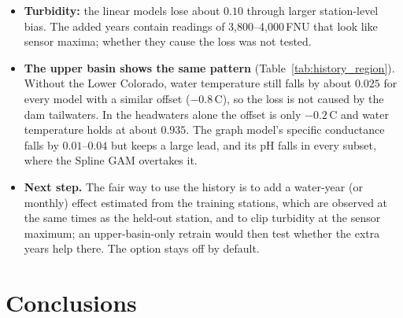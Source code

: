 \documentclass[11pt]{article}
\begin{document}
\begin{itemize}
        (standard deviation $0.11\to0.15$), so the graph model loses the station-level information
        that gave it its lead. The conventional models do not change.
  \item \textbf{Turbidity:} the linear models lose about $0.10$ through larger station-level bias.
        The added years contain readings of 3{,}800--4{,}000\,FNU that look like sensor maxima;
        whether they cause the loss was not tested.
  \item \textbf{The upper basin shows the same pattern} (Table~\ref{tab:history_region}). Without
        the Lower Colorado, water temperature still falls by about $0.025$ for every model with a
        similar offset ($-0.8$\,\textdegree C), so the loss is not caused by the dam tailwaters. In
        the headwaters alone the offset is only $-0.2$\,\textdegree C and water temperature holds at
        about $0.935$. The graph model's specific conductance falls by $0.01$--$0.04$ but keeps a
        large lead, and its pH falls in every subset, where the Spline GAM overtakes it.
  \item \textbf{Next step.} The fair way to use the history is to add a water-year (or monthly)
        effect estimated from the training stations, which are observed at the same times as the
        held-out station, and to clip turbidity at the sensor maximum; an upper-basin-only retrain
        would then test whether the extra years help there. The option stays off by default.
\end{itemize}

\section{Conclusions}
\end{document}
